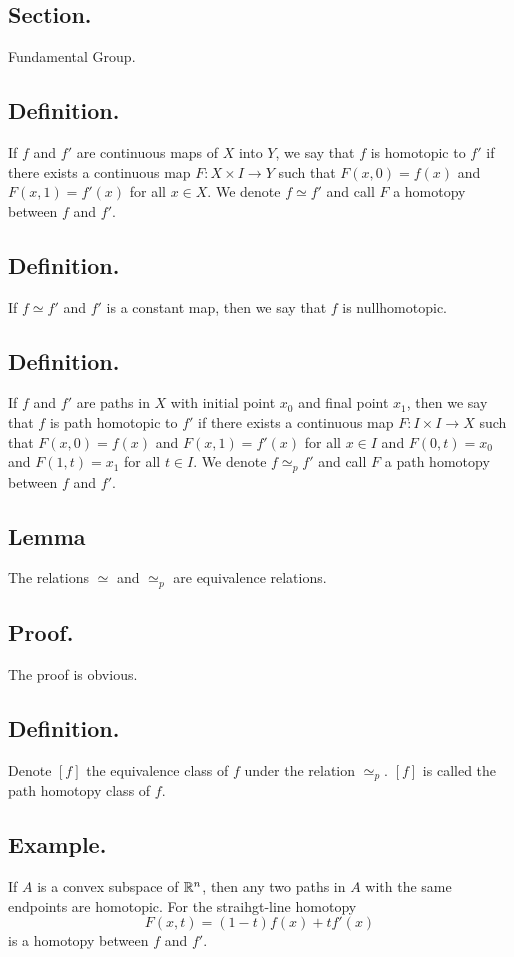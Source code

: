 \documentclass[titlepage]{article}
\begin{document}
\subsection{Section.} Fundamental Group.

\subsection{Definition.} If $f$ and $f'$ are continuous maps of $X$ into $Y$, we say that $f$ is homotopic to $f'$ if there exists a continuous map $F: X \times I \to Y$ such that $F(x, 0) = f(x)$ and $F(x, 1) = f'(x)$ for all $x \in X$. We denote $f \simeq f'$ and call $F$ a homotopy between $f$ and $f'$.

\subsection{Definition.} If $f \simeq f'$ and $f'$ is a constant map, then we say that $f$ is nullhomotopic.

\subsection{Definition.} If $f$ and $f'$ are paths in $X$ with initial point $x_{0}$ and final point $x_{1}$, then we say that $f$ is path homotopic to $f'$ if there exists a continuous map $F: I \times I \to X$ such that $F(x, 0) = f(x)$ and $F(x, 1) = f'(x)$ for all $x \in I$ and $F(0, t) = x_{0}$ and $F(1, t) = x_{1}$ for all $t \in I$. We denote $f \simeq_{p} f'$ and call $F$ a path homotopy between $f$ and $f'$.

\subsection{Lemma} The relations $\simeq$ and $\simeq_{p}$ are equivalence relations.

\subsection{Proof.} The proof is obvious.

\subsection{Definition.} Denote $[f]$ the equivalence class of $f$ under the relation $\simeq_{p}$. $[f]$ is called the path homotopy class of $f$.

\subsection{Example.} If $A$ is a convex subspace of $\mathbb{R}^{n}$, then any two paths in $A$ with the same endpoints are homotopic. For the straihgt-line homotopy 
$$F(x, t) = (1 - t)f(x) + tf'(x)$$
is a homotopy between $f$ and $f'$.
\end{document}
